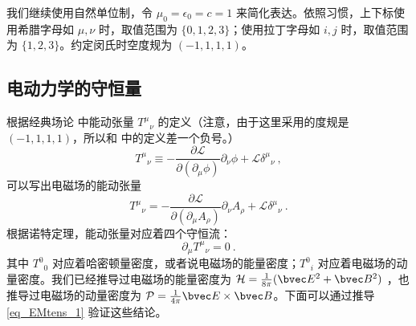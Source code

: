 

我们继续使用自然单位制，令 $\mu_0=\epsilon_0=c=1$ 来简化表达。依照习惯，上下标使用希腊字母如 $\mu, \nu$ 时，取值范围为 $\{0, 1, 2, 3\}$；使用拉丁字母如 $i, j$ 时，取值范围为 $\{1, 2, 3\}$。约定闵氏时空度规为 $(-1,1,1,1)$。

\subsection{电动力学的守恒量}
根据经典场论 中能动张量 ${T^\mu}_\nu$ 的定义（注意，由于这里采用的度规是 $(-1,1,1,1)$，所以和  中的定义差一个负号。）
\begin{equation}
T^\mu{}_\nu \equiv -\frac{\partial \mathcal L}{\partial (\partial_\mu \phi)} \partial_\nu \phi + \mathcal L \delta^\mu{}_\nu~,
\end{equation}
可以写出电磁场的能动张量
\begin{equation}\label{eq_EMtens_1}
T^\mu{}_\nu =-\frac{\partial \mathcal L}{\partial (\partial_\mu A_\rho)} \partial_\nu A_\rho + \mathcal L \delta^\mu{}_\nu~.
\end{equation}
根据诺特定理，能动张量对应着四个守恒流：
\begin{equation}
\partial_\mu T^\mu{}_\nu=0~.
\end{equation}
其中 $T^0{}_0$ 对应着哈密顿量密度，或者说电磁场的能量密度；$T^0{}_i$ 对应着电磁场的动量密度。我们已经推导过电磁场的能量密度为 $\mathcal H=\frac{1}{8\pi}(\bvec E^2+\bvec B^2)$ ，也推导过电磁场的动量密度为 $\mathcal P=\frac{1}{4\pi} \bvec E\times \bvec B$。下面可以通过推导 \autoref{eq_EMtens_1} 验证这些结论。

